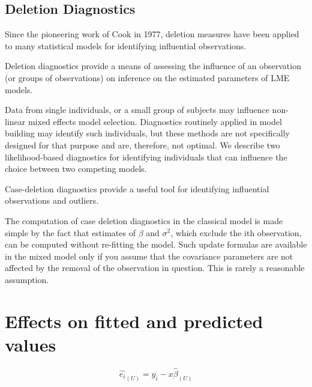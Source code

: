 \documentclass[00-ResidualsMain.tex]{subfiles}
\begin{document}
	\subsection{Deletion Diagnostics}
	
	Since the pioneering work of Cook in 1977, deletion measures have been applied to many statistical models for identifying influential observations.
	
	Deletion diagnostics provide a means of assessing the influence of an observation (or groups of observations) on inference on the estimated parameters of LME models.
	
	Data from single individuals, or a small group of subjects may influence non-linear mixed effects model selection. Diagnostics routinely applied in model building may identify such individuals, but these methods are not specifically designed for that purpose and are, therefore, not optimal. We describe two likelihood-based diagnostics for identifying individuals that can influence the choice between two competing models.
	
	Case-deletion diagnostics provide a useful tool for identifying influential observations and outliers.
	
	The computation of case deletion diagnostics in the classical model is made simple by the fact that estimates of $\beta$ and $\sigma^2$, which exclude the ith observation, can be computed without re-fitting the model. Such update formulas are available in the mixed model only if you assume that the covariance parameters are not affected by the removal of the observation in question. This is rarely a reasonable assumption.
	
	\section{Effects on fitted and predicted values}
	\begin{equation}
	\hat{e_{i}}_{(U)} = y_{i} - x\hat{\beta}_{(U)}
	\end{equation}
	
\end{document}
